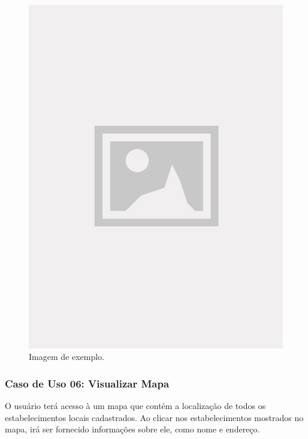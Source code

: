\begin{figure}[!htb]
\centering
\caption{Imagem de exemplo.}
\includegraphics[width=\linewidth]{figuras/placeholder.jpg}
\end{figure}

\subsubsection{Caso de Uso 06: Visualizar Mapa}

O usuário terá acesso à um mapa que contém a localização de todos os estabelecimentos locais cadastrados. Ao clicar nos estabelecimentos mostrados no mapa, irá ser fornecido informações sobre ele, como nome e endereço.


